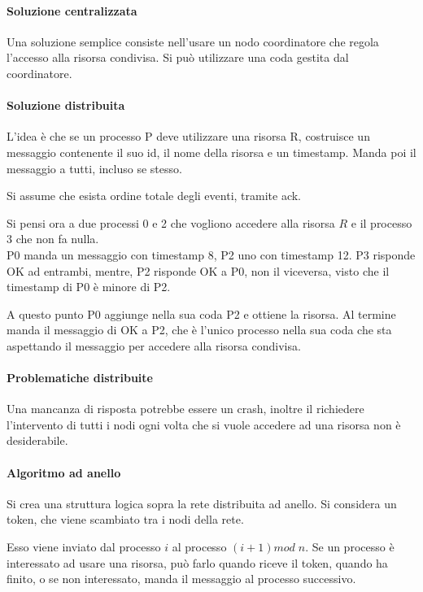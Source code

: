 \paragraph{Soluzione centralizzata}
Una soluzione semplice consiste nell'usare un nodo 
coordinatore che regola l'accesso alla risorsa 
condivisa. Si può utilizzare una coda gestita dal coordinatore.

\paragraph{Soluzione distribuita}
L'idea è che se un processo P deve utilizzare una risorsa
R, costruisce un messaggio contenente il suo id, il nome 
della risorsa e un timestamp. Manda poi il messaggio a tutti, 
incluso se stesso.

Si assume che esista ordine totale degli eventi, tramite 
ack.

Si pensi ora a due processi 0 e 2 che vogliono accedere 
alla risorsa $R$ e il processo 3 che non fa nulla.\\
P0 manda un messaggio con timestamp 8, P2 uno con timestamp 12.
P3 risponde OK ad entrambi, mentre, P2 risponde OK a P0, 
non il viceversa, visto che il timestamp di P0 è minore di P2.

A questo punto P0 aggiunge nella sua coda P2 e ottiene la 
risorsa. Al termine manda il messaggio di OK a P2, che è l'unico 
processo nella sua coda che sta aspettando il messaggio 
per accedere alla risorsa condivisa.

\paragraph{Problematiche distribuite}
Una mancanza di risposta potrebbe essere un crash, 
inoltre il richiedere l'intervento di tutti 
i nodi ogni volta che si vuole accedere ad una risorsa non è
desiderabile.

\paragraph{Algoritmo ad anello}
Si crea una struttura logica sopra la rete distribuita ad anello.
Si considera un token, che viene scambiato tra i nodi della rete.

Esso viene inviato dal processo $i$ al processo $(i+1)\mathit{mod\;}n$.
Se un processo è interessato ad usare una risorsa, può farlo 
quando riceve il token, quando ha finito, o se non interessato, 
manda il messaggio al processo successivo.


